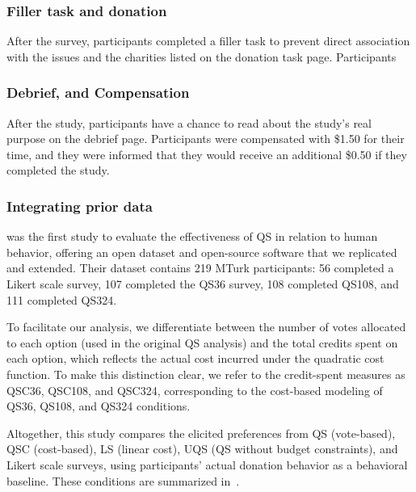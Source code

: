 \subsubsection{Filler task and donation}
After the survey, participants completed a filler task to prevent direct association with the issues and the charities listed on the donation task page. Participants 

\subsubsection{Debrief, and Compensation}
After the study, participants have a chance to read about the study's real purpose on the debrief page. Participants were compensated with \$1.50 for their time, and they were informed that they would receive an additional \$0.50 if they completed the study.

\subsubsection{Integrating prior data}
\citet{chengCanShowWhat2021} was the first study to evaluate the effectiveness of QS in relation to human behavior, offering an open dataset and open-source software that we replicated and extended. Their dataset contains 219 MTurk participants: 56 completed a Likert scale survey, 107 completed the QS36 survey, 108 completed QS108, and 111 completed QS324.

To facilitate our analysis, we differentiate between the number of votes allocated to each option (used in the original QS analysis) and the total credits spent on each option, which reflects the actual cost incurred under the quadratic cost function. To make this distinction clear, we refer to the credit-spent measures as QSC36, QSC108, and QSC324, corresponding to the cost-based modeling of QS36, QS108, and QS324 conditions.

Altogether, this study compares the elicited preferences from QS (vote-based), QSC (cost-based), LS (linear cost), UQS (QS without budget constraints), and Likert scale surveys, using participants' actual donation behavior as a behavioral baseline. These conditions are summarized in~.


